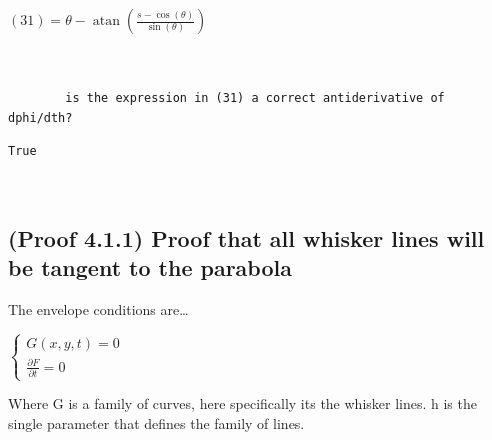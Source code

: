 \documentclass[11pt]{article}
\begin{document}
            $\displaystyle (31) = \theta - \operatorname{atan}{\left(\frac{s - \cos{\left(\theta \right)}}{\sin{\left(\theta \right)}} \right)}$

            
            \begin{Verbatim}[commandchars=\\\{\}]


        is the expression in (31) a correct antiderivative of dphi/dth?
            \end{Verbatim}

            
            \begin{Verbatim}[commandchars=\\\{\}]
        True
            \end{Verbatim}

            
            \begin{Verbatim}[commandchars=\\\{\}]


            \end{Verbatim}

    \subsection{(Proof 4.1.1) Proof that all whisker lines will be tangent to the parabola}\label{proof-that-all-whisker-lines-will-be-tangent-to-the-parabola}

        The envelope conditions are\ldots{}

        \(\left\{\begin{matrix}
        G(x,y,t) = 0
        \\ 
        \frac{\partial F}{\partial t} = 0
        \end{matrix}\right.\)

        Where G is a family of curves, here specifically its the whisker lines.
        h is the single parameter that defines the family of lines.
\end{document}
